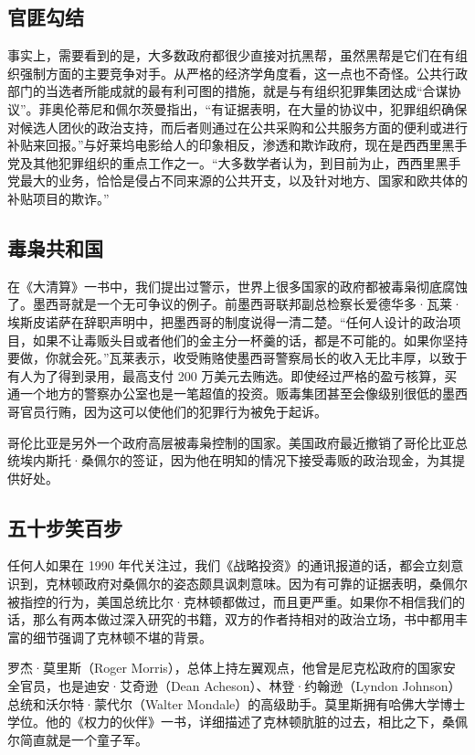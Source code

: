 \subsection{官匪勾结}
事实上，需要看到的是，大多数政府都很少直接对抗黑帮，虽然黑帮是它们在有组织强制方面的主要竞争对手。从严格的经济学角度看，这一点也不奇怪。公共行政部门的当选者所能成就的最有利可图的措施，就是与有组织犯罪集团达成“合谋协议”。菲奥伦蒂尼和佩尔茨曼指出，“有证据表明，在大量的协议中，犯罪组织确保对候选人团伙的政治支持，而后者则通过在公共采购和公共服务方面的便利或进行补贴来回报。”与好莱坞电影给人的印象相反，渗透和欺诈政府，现在是西西里黑手党及其他犯罪组织的重点工作之一。“大多数学者认为，到目前为止，西西里黑手党最大的业务，恰恰是侵占不同来源的公共开支，以及针对地方、国家和欧共体的补贴项目的欺诈。”

\subsection{毒枭共和国}
在《大清算》一书中，我们提出过警示，世界上很多国家的政府都被毒枭彻底腐蚀了。墨西哥就是一个无可争议的例子。前墨西哥联邦副总检察长爱德华多·瓦莱·埃斯皮诺萨在辞职声明中，把墨西哥的制度说得一清二楚。“任何人设计的政治项目，如果不让毒贩头目或者他们的金主分一杯羹的话，都是不可能的。如果你坚持要做，你就会死。”瓦莱表示，收受贿赂使墨西哥警察局长的收入无比丰厚，以致于有人为了得到录用，最高支付 200 万美元去贿选。即使经过严格的盈亏核算，买通一个地方的警察办公室也是一笔超值的投资。贩毒集团甚至会像级别很低的墨西哥官员行贿，因为这可以使他们的犯罪行为被免于起诉。

哥伦比亚是另外一个政府高层被毒枭控制的国家。美国政府最近撤销了哥伦比亚总统埃内斯托·桑佩尔的签证，因为他在明知的情况下接受毒贩的政治现金，为其提供好处。

\subsection{五十步笑百步}
任何人如果在 1990 年代关注过，我们《战略投资》的通讯报道的话，都会立刻意识到，克林顿政府对桑佩尔的姿态颇具讽刺意味。因为有可靠的证据表明，桑佩尔被指控的行为，美国总统比尔·克林顿都做过，而且更严重。如果你不相信我们的话，那么有两本做过深入研究的书籍，双方的作者持相对的政治立场，书中都用丰富的细节强调了克林顿不堪的背景。

罗杰·莫里斯（Roger Morris），总体上持左翼观点，他曾是尼克松政府的国家安全官员，也是迪安·艾奇逊（Dean Acheson）、林登·约翰逊（Lyndon Johnson）总统和沃尔特·蒙代尔（Walter Mondale）的高级助手。莫里斯拥有哈佛大学博士学位。他的《权力的伙伴》一书，详细描述了克林顿肮脏的过去，相比之下，桑佩尔简直就是一个童子军。

